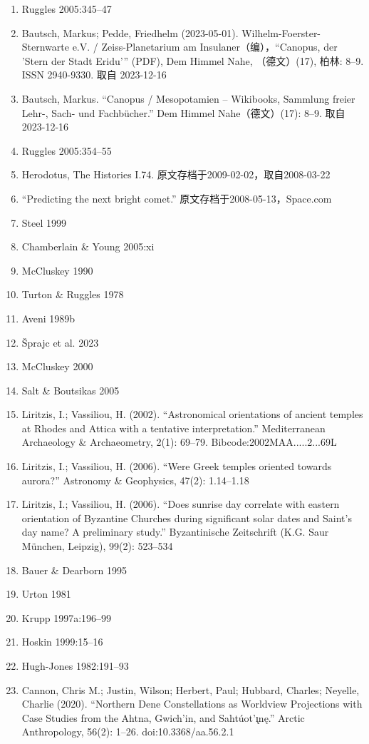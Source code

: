 \begin{enumerate}
    \item Ruggles 2005:345–47
    \item Bautsch, Markus; Pedde, Friedhelm (2023-05-01). Wilhelm-Foerster-Sternwarte e.V. / Zeiss-Planetarium am Insulaner（编），“Canopus, der 'Stern der Stadt Eridu'” (PDF), Dem Himmel Nahe, （德文）(17), 柏林: 8–9. ISSN 2940-9330. 取自 2023-12-16
    \item Bautsch, Markus. “Canopus / Mesopotamien – Wikibooks, Sammlung freier Lehr-, Sach- und Fachbücher.” Dem Himmel Nahe（德文）(17): 8–9. 取自 2023-12-16
    \item Ruggles 2005:354–55
    \item Herodotus, The Histories I.74. 原文存档于2009-02-02，取自2008-03-22
    \item “Predicting the next bright comet.” 原文存档于2008-05-13，Space.com
    \item Steel 1999
    \item Chamberlain \& Young 2005:xi
    \item McCluskey 1990
    \item Turton \& Ruggles 1978
    \item Aveni 1989b
    \item Šprajc et al. 2023
    \item McCluskey 2000
    \item Salt \& Boutsikas 2005
    \item Liritzis, I.; Vassiliou, H. (2002). “Astronomical orientations of ancient temples at Rhodes and Attica with a tentative interpretation.” Mediterranean Archaeology \& Archaeometry, 2(1): 69–79. Bibcode:2002MAA.....2...69L
    \item Liritzis, I.; Vassiliou, H. (2006). “Were Greek temples oriented towards aurora?” Astronomy \& Geophysics, 47(2): 1.14–1.18
    \item Liritzis, I.; Vassiliou, H. (2006). “Does sunrise day correlate with eastern orientation of Byzantine Churches during significant solar dates and Saint’s day name? A preliminary study.” Byzantinische Zeitschrift (K.G. Saur München, Leipzig), 99(2): 523–534
    \item Bauer \& Dearborn 1995
    \item Urton 1981
    \item Krupp 1997a:196–99
    \item Hoskin 1999:15–16
    \item Hugh-Jones 1982:191–93
    \item Cannon, Chris M.; Justin, Wilson; Herbert, Paul; Hubbard, Charles; Neyelle, Charlie (2020). “Northern Dene Constellations as Worldview Projections with Case Studies from the Ahtna, Gwich'in, and Sahtúot'ı̨nę.” Arctic Anthropology, 56(2): 1–26. doi:10.3368/aa.56.2.1

\end{enumerate}
